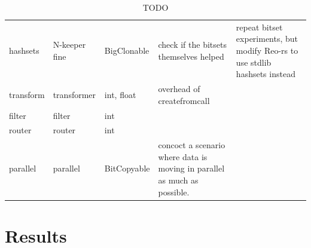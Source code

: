\begin{landscape}
\begin{table}[p!]
\begin{adjustbox}{width=19cm}
\begin{tabular}{l|ll|p{46mm}p{67mm}}
hashsets & N-keeper fine & BigClonable & check if the bitsets themselves helped & repeat bitset experiments, but modify Reo-rs to use stdlib hashsets instead \\

transform & transformer & int, float & overhead of createfromcall & \\

filter & filter & int & & \\

router & router & int & & \\

parallel & parallel & BitCopyable & concoct a scenario where data is moving in parallel as much as possible. & 

\end{tabular}
\end{adjustbox}
\caption[TODO]{TODO}	
\end{table}
\end{landscape}

\section{Results}

